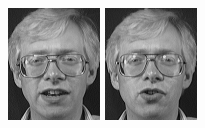 \begin{figure}[ht]
 \includegraphics[width=\columnwidth/11]{ch3/figures/s2_7.png}
 \includegraphics[width=\columnwidth/11]{ch3/figures/s2_8.png}

\end{figure}
